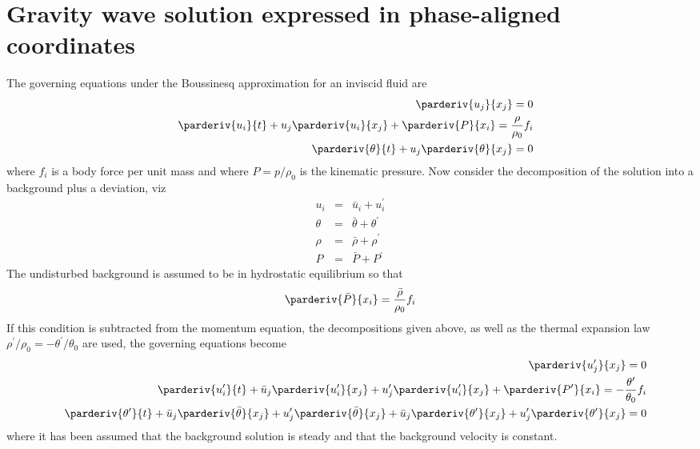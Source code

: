 \documentclass[12pt]{article}
\begin{document}
\section*{Gravity wave solution expressed in phase-aligned coordinates}

The governing equations under the Boussinesq approximation for an inviscid
fluid are
%
\begin{eqnarray}
& & \parderiv{u_j}{x_j} =0\\
& & \parderiv{u_i}{t} + u_j\parderiv{u_i}{x_j} + \parderiv{P}{x_i} =
\frac{\rho}{\rho_0} f_i\\
& & \parderiv{\theta}{t} + u_j\parderiv{\theta}{x_j} = 0
\label{governing}
\end{eqnarray}
%
where $f_i$ is a body force per unit mass and where $P=p/\rho_0$ is the
kinematic pressure.  Now consider the decomposition of
the solution into a background plus a deviation, viz
%
\begin{eqnarray}
u_i & = & \bar{u}_i + u_i^\prime\\
\theta & = & \bar{\theta} + \theta^\prime\\
\rho & = & \bar{\rho} + \rho^\prime\\
P & = & \bar{P} + P^\prime
\label{perturbations}
\end{eqnarray}
%
The undisturbed background is assumed to be in hydrostatic equilibrium so
that
%
\begin{equation}
\parderiv{\bar{P}}{x_i} = \frac{\bar{\rho}}{\rho_0} f_i
\label{hydrostatic}
\end{equation}
%
If this condition is subtracted from the momentum equation, the 
decompositions given above, as well as the thermal expansion law
$\rho^\prime/\rho_0=-\theta^\prime/\theta_0$ are used, the governing 
equations become
%
\begin{eqnarray}
& & \parderiv{u^\prime_j}{x_j} =0\\
& & \parderiv{u^\prime_i}{t} + \bar{u}_j\parderiv{u^\prime_i}{x_j} + 
u^\prime_j\parderiv{u^\prime_i}{x_j} +
\parderiv{P^\prime}{x_i} = -\frac{\theta^\prime}{\theta_0} f_i\\
& & \parderiv{\theta^\prime}{t} + \bar{u}_j\parderiv{\bar{\theta}}{x_j} +
u^\prime_j\parderiv{\bar{\theta}}{x_j} + 
\bar{u}_j\parderiv{\theta^\prime}{x_j} + 
u^\prime_j\parderiv{\theta^\prime}{x_j} = 0
\end{eqnarray}
%
where it has been assumed that the background solution is steady and that
the background velocity is constant.
\end{document}
